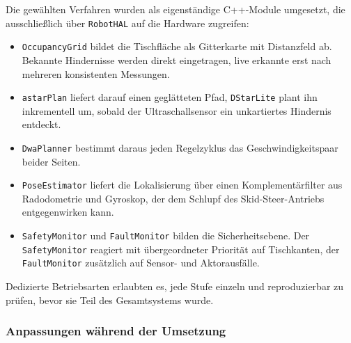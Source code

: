 Die gewählten Verfahren wurden als eigenständige C++-Module umgesetzt, die ausschließlich über \texttt{RobotHAL} auf die Hardware zugreifen:
\begin{itemize}[itemsep=2pt,topsep=3pt,parsep=0pt]
    \item \texttt{OccupancyGrid} bildet die Tischfläche als Gitterkarte mit Distanzfeld ab. Bekannte Hindernisse werden direkt eingetragen, live erkannte erst nach mehreren konsistenten Messungen.
    \item \texttt{astarPlan} liefert darauf einen geglätteten Pfad, \texttt{DStarLite} plant ihn inkrementell um, sobald der Ultraschallsensor ein unkartiertes Hindernis entdeckt.
    \item \texttt{DwaPlanner} bestimmt daraus jeden Regelzyklus das Geschwindigkeitspaar beider Seiten.
    \item \texttt{PoseEstimator} liefert die Lokalisierung über einen Komplementärfilter aus Radodometrie und Gyroskop, der dem Schlupf des Skid-Steer-Antriebs entgegenwirken kann.
    \item \texttt{SafetyMonitor} und \texttt{FaultMonitor} bilden die Sicherheitsebene. Der \texttt{SafetyMonitor} reagiert mit übergeordneter Priorität auf Tischkanten, der \texttt{FaultMonitor} zusätzlich auf Sensor- und Aktorausfälle.
\end{itemize}
Dedizierte Betriebsarten erlaubten es, jede Stufe einzeln und reproduzierbar zu prüfen, bevor sie Teil des Gesamtsystems wurde.

\subsubsection*{Anpassungen während der Umsetzung}

